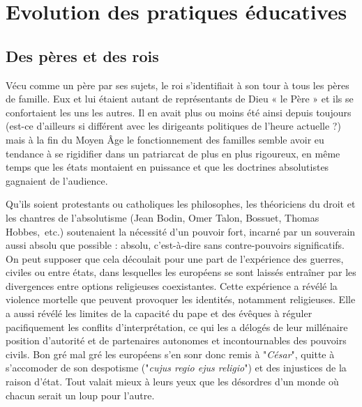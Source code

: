 
\chapter{Evolution des pratiques éducatives}


 \section{Des pères et des rois}


Vécu comme un père par ses sujets, le roi s'identifiait à son tour à tous les pères de famille. Eux et lui étaient autant de représentants de Dieu « le Père » et ils se confortaient les uns les autres. Il en avait plus ou moins été ainsi depuis toujours (est-ce d'ailleurs si différent avec les dirigeants politiques de l'heure actuelle ?) mais à la fin du Moyen Âge le fonctionnement des familles semble avoir eu tendance à se rigidifier dans un patriarcat de plus en plus rigoureux, en même temps que les états montaient en puissance et que les doctrines absolutistes gagnaient de l'audience. 

Qu'ils soient protestants ou catholiques les philosophes, les théoriciens du droit et les chantres de l'absolutisme (Jean Bodin, Omer Talon, Bossuet, Thomas Hobbes,~etc.) soutenaient la nécessité d'un pouvoir fort, incarné par un souverain aussi absolu que possible : absolu, c'est-à-dire sans contre-pouvoirs significatifs. On peut supposer que cela découlait pour une part de l'expérience des guerres, civiles ou entre états, dans lesquelles les européens se sont laissés entraîner par les divergences entre options religieuses coexistantes. Cette expérience a révélé la violence mortelle que peuvent provoquer les identités, notamment religieuses. Elle a aussi révélé les limites de la capacité du pape et des évêques à réguler pacifiquement les conflits d'interprétation, ce qui les a délogés de leur millénaire position d'autorité et de partenaires autonomes et incontournables des pouvoirs civils. Bon gré mal gré les européens s'en sonr donc remis à "\emph{César}", quitte à s'accomoder de son despotisme ("\emph{cujus regio ejus religio}") et des injustices de la raison d'état. Tout valait mieux à leurs yeux que les désordres d'un monde où chacun serait un loup pour l'autre. 

